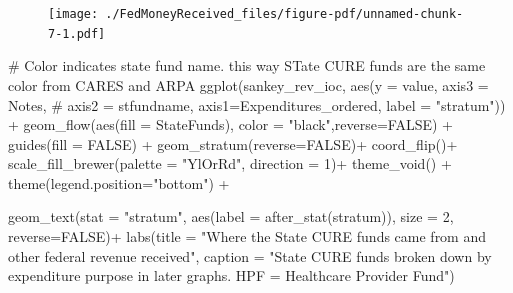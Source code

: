 \documentclass[
  letterpaper,
  DIV=11,
  numbers=noendperiod]{scrreport}
\newenvironment{Shaded}{\begin{snugshade}}{\end{snugshade}}
\newcommand{\AttributeTok}[1]{\textcolor[rgb]{0.40,0.45,0.13}{#1}}
\newcommand{\CommentTok}[1]{\textcolor[rgb]{0.37,0.37,0.37}{#1}}
\newcommand{\ConstantTok}[1]{\textcolor[rgb]{0.56,0.35,0.01}{#1}}
\newcommand{\DecValTok}[1]{\textcolor[rgb]{0.68,0.00,0.00}{#1}}
\newcommand{\FunctionTok}[1]{\textcolor[rgb]{0.28,0.35,0.67}{#1}}
\newcommand{\NormalTok}[1]{\textcolor[rgb]{0.00,0.23,0.31}{#1}}
\newcommand{\SpecialCharTok}[1]{\textcolor[rgb]{0.37,0.37,0.37}{#1}}
\newcommand{\StringTok}[1]{\textcolor[rgb]{0.13,0.47,0.30}{#1}}
\begin{document}
\begin{figure}[H]

{\centering \texttt{[image: ./FedMoneyReceived\_files/figure-pdf/unnamed-chunk-7-1.pdf]}

}

\end{figure}

\begin{Shaded}
\begin{Highlighting}[]
\CommentTok{\# Color indicates state fund name. this way STate CURE funds are the same color from CARES and ARPA}
\FunctionTok{ggplot}\NormalTok{(sankey\_rev\_ioc, }
       \FunctionTok{aes}\NormalTok{(}\AttributeTok{y =}\NormalTok{ value, }\AttributeTok{axis3 =}\NormalTok{ Notes, }
         \CommentTok{\#  axis2 = stfundname, }
           \AttributeTok{axis1=}\NormalTok{Expenditures\_ordered, }\AttributeTok{label =} \StringTok{"stratum"}\NormalTok{)) }\SpecialCharTok{+}
  \FunctionTok{geom\_flow}\NormalTok{(}\FunctionTok{aes}\NormalTok{(}\AttributeTok{fill =}\NormalTok{ StateFunds), }\AttributeTok{color =} \StringTok{"black"}\NormalTok{,}\AttributeTok{reverse=}\ConstantTok{FALSE}\NormalTok{) }\SpecialCharTok{+}
  \FunctionTok{guides}\NormalTok{(}\AttributeTok{fill =} \ConstantTok{FALSE}\NormalTok{) }\SpecialCharTok{+}   
  \FunctionTok{geom\_stratum}\NormalTok{(}\AttributeTok{reverse=}\ConstantTok{FALSE}\NormalTok{)}\SpecialCharTok{+}
\FunctionTok{coord\_flip}\NormalTok{()}\SpecialCharTok{+}
   \FunctionTok{scale\_fill\_brewer}\NormalTok{(}\AttributeTok{palette =} \StringTok{"YlOrRd"}\NormalTok{, }\AttributeTok{direction =} \DecValTok{1}\NormalTok{)}\SpecialCharTok{+}
  \FunctionTok{theme\_void}\NormalTok{() }\SpecialCharTok{+}  
  \FunctionTok{theme}\NormalTok{(}\AttributeTok{legend.position=}\StringTok{"bottom"}\NormalTok{) }\SpecialCharTok{+}

  \FunctionTok{geom\_text}\NormalTok{(}\AttributeTok{stat =} \StringTok{"stratum"}\NormalTok{, }\FunctionTok{aes}\NormalTok{(}\AttributeTok{label =} \FunctionTok{after\_stat}\NormalTok{(stratum)), }\AttributeTok{size =} \DecValTok{2}\NormalTok{, }\AttributeTok{reverse=}\ConstantTok{FALSE}\NormalTok{)}\SpecialCharTok{+}
  \FunctionTok{labs}\NormalTok{(}\AttributeTok{title =} \StringTok{"Where the State CURE funds came from and other federal revenue received"}\NormalTok{,}
       \AttributeTok{caption =} \StringTok{"State CURE funds broken down by expenditure purpose in later graphs.}
\StringTok{       HPF = Healthcare Provider Fund"}\NormalTok{)}
\end{Highlighting}
\end{Shaded}
\end{document}
